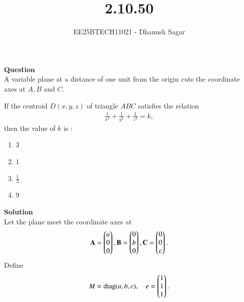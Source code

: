 \documentclass[journal]{IEEEtran}
\begin{document}



\title{2.10.50}
\author{EE25BTECH11021 - Dhanush Sagar
}
{\let\newpage\relax\maketitle}

\renewcommand{\thefigure}{\theenumi}
\renewcommand{\thetable}{\theenumi}
\setlength{\intextsep}{10pt} %


\renewcommand{\thetable}{\theenumi}


\textbf{Question} \\
 A variable plane at a distance of one unit from the origin cuts the coordinate axes at $A, B$ and $C$.  


If the centroid $D(x,y,z)$ of triangle $ABC$ satisfies the relation  
\begin{align*}
\frac{1}{x^{2}} + \frac{1}{y^{2}} + \frac{1}{z^{2}} = k,
\end{align*}
then the value of $k$ is :  

\begin{multicols}{2}
\begin{enumerate}
    \item $3$
    \item $1$
    \item $\tfrac{1}{3}$
    \item $9$
\end{enumerate}
\end{multicols}

\textbf{Solution} \\

Let the plane meet the coordinate axes at 
\begin{align*}
\mathbf{A} = \begin{pmatrix}a\\0\\0\end{pmatrix}, 
\mathbf{B} = \begin{pmatrix}0\\b\\0\end{pmatrix}, 
\mathbf{C} = \begin{pmatrix}0\\0\\c\end{pmatrix}.
\end{align*}
Define
\begin{align*}
    M = \mathrm{diag}(a,b,c), 
\quad 
e = \begin{pmatrix}1 \\ 1 \\ 1\end{pmatrix}.
\end{align*}
\end{document}
